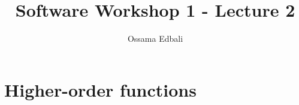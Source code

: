 \documentclass{article}
\title{Software Workshop 1 - Lecture 2}
\author{Ossama Edbali}
\begin{document}
	\maketitle
	
	\section{Higher-order functions}
	
	
	
\end{document}
